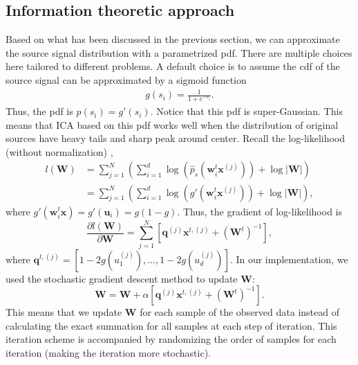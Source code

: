 \documentclass[aps,prl,preprint,superscriptaddress]{revtex4-2}
\begin{document}
\subsection{Information theoretic approach}
Based on what has been discussed in the previous section, we can approximate the source signal distribution with a parametrized pdf. There are multiple choices here tailored to different problems. A default choice is to assume the cdf of the source signal can be approximated by a sigmoid function
\begin{align}
g(s_{i}) = \frac{1}{1+e^{-s_{i}}}.
\end{align}
Thus, the pdf is $p(s_{i}) = g'(s_{i})$.
Notice that this pdf is super-Gaussian. This means that ICA based on this pdf works well when the distribution of original sources have heavy tails and sharp peak around center. Recall the log-likelihood (without normalization) \cite{ng_cs229},
\begin{align}
l(\mathbf{W}) &= \sum_{j=1}^{N} \left(\sum_{i=1}^{d}\log(\hat{p}_{s}(\mathbf{w}_{i}^{t}\mathbf{x}^{(j)}))+\log|\mathbf{W}|\right) \\
&= \sum_{j=1}^{N} \left(\sum_{i=1}^{d}\log(g'(\mathbf{w}_{i}^{t}\mathbf{x}^{(j)}))+\log|\mathbf{W}| \right),
\end{align}
where $g'(\mathbf{w}_{i}^{t}\mathbf{x}) = g'(\mathbf{u}_{i}) = g(1-g)$.
Thus, the gradient of log-likelihood is
\begin{equation}
\frac{\partial l(\mathbf{W})}{\partial \mathbf{W}} = \sum_{j=1}^{N} [\mathbf{q}^{(j)}\mathbf{x}^{t, (j)} + (\mathbf{W}^{t})^{-1}],
\end{equation}
where $\mathbf{q}^{t, (j)} = [1-2g(u_{1}^{(j)}), \ldots ,1-2g(u_{d}^{(j)}) ]$.
In our implementation, we used the stochastic gradient descent method to update $\mathbf{W}$:
\begin{equation}
\mathbf{W} = \mathbf{W} + \alpha [\mathbf{q}^{(j)}\mathbf{x}^{t, (j)} + (\mathbf{W}^{t})^{-1}].
\end{equation}
This means that we update $\mathbf{W}$ for each sample of the observed data instead of calculating the exact summation for all samples at each step of iteration.
This iteration scheme is accompanied by randomizing the order of samples for each iteration (making the iteration more stochastic).
\end{document}
